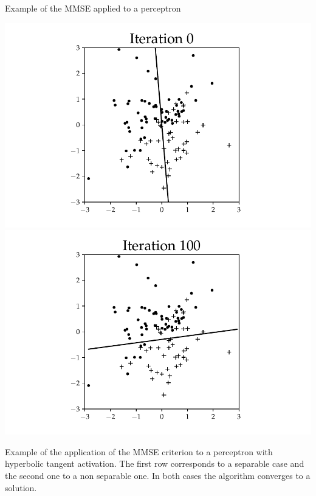 \documentclass{beamer}
\begin{document}
\begin{frame}{Example of the MMSE applied to a perceptron}
\begin{center}
    \includegraphics[scale=0.3]{Module 1 (NN)/pics/figure_0_MMSE_nsep.pdf}\includegraphics[scale=0.3]{Module 1 (NN)/pics/figure_100_MMSE_nsep.pdf}
    \end{center}
    
    \tiny{Example of the application of the MMSE criterion to a perceptron with hyperbolic tangent activation. The first row corresponds to a separable case and the second one to a non separable  one. In both cases the algorithm converges to a solution.}

\end{frame}



 
 
\end{document}
